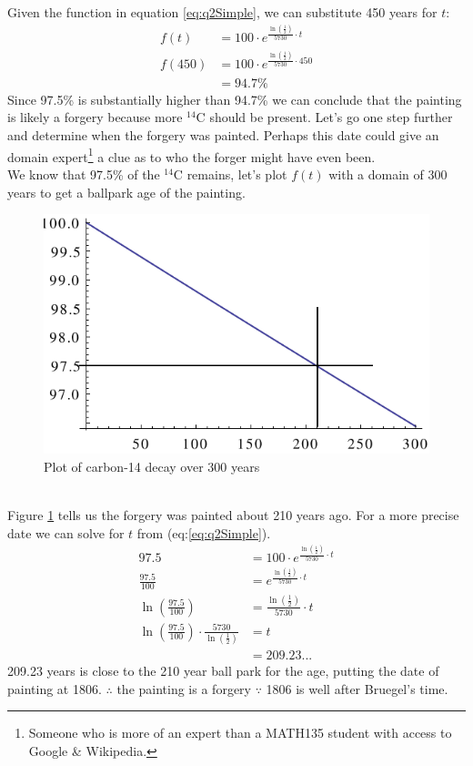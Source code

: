 Given the function in equation \ref{eq:q2Simple}, we can substitute 450 years for $t$:
\begin{align}
  f(t) &= 100 \cdot e^{\frac{\ln\left(\frac{1}{2}\right)}{5730} \cdot t} \nonumber \\
  f(450) &= 100 \cdot e^{\frac{\ln\left(\frac{1}{2}\right)}{5730} \cdot 450} \nonumber \\
    &= 94.7\%
\end{align}
Since 97.5\% is substantially higher than 94.7\% we can conclude that the
painting is likely a forgery because more $^{14}$C should be present.
Let's go one step further and determine when the forgery was painted. Perhaps
this date could give an domain expert\footnote{Someone who is more of an expert
than a MATH135 student with access to Google \& Wikipedia.} a clue as to who the
forger might have even been.
\\
We know that 97.5\% of the $^{14}$C remains, let's plot $f(t)$ with a domain of
300 years to get a ballpark age of the painting.
\begin{figure}[!h]
  \centering
  \includegraphics[width=\linewidth]{solutions/q2/q2plot.pdf}
\caption{Plot of carbon-14 decay over 300 years}
\label{fig:q2plot}
\end{figure} \\
Figure \ref{fig:q2plot} tells us the forgery was painted about 210 years ago.
For a more precise date we can solve for $t$ from (eq:\ref{eq:q2Simple}).
\begin{align}
  97.5 &= 100 \cdot e^{\frac{\ln\left(\frac{1}{2}\right)}{5730} \cdot t} \nonumber \\
  \frac{97.5}{100} &= e^{\frac{\ln\left(\frac{1}{2}\right)}{5730} \cdot t} \\
  \ln\left(\frac{97.5}{100} \right) &= \frac{\ln\left(\frac{1}{2}\right)}{5730} \cdot t \\
  \ln\left(\frac{97.5}{100} \right) \cdot \frac{5730}{\ln\left(\frac{1}{2}\right)} &= t \\
   &= 209.23...
\end{align}
209.23 years is close to the 210 year ball park for the age, putting the date of
painting at 1806. $\therefore$ the painting is a forgery $\because$ 1806 is well
after Bruegel's time. \qedbitches
